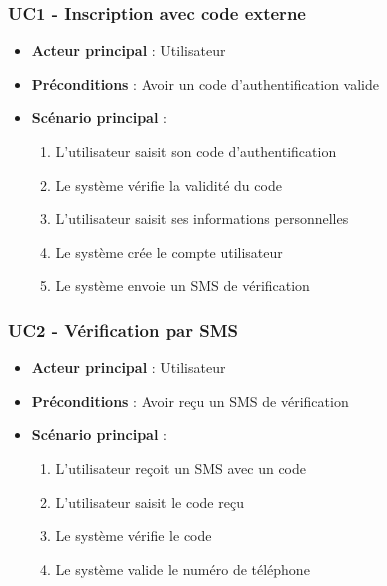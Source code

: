 \documentclass[12pt,a4paper]{article}
\begin{document}
\subsubsection{UC1 - Inscription avec code externe}
\begin{itemize}
    \item \textbf{Acteur principal} : Utilisateur
    \item \textbf{Préconditions} : Avoir un code d'authentification valide
    \item \textbf{Scénario principal} :
    \begin{enumerate}
        \item L'utilisateur saisit son code d'authentification
        \item Le système vérifie la validité du code
        \item L'utilisateur saisit ses informations personnelles
        \item Le système crée le compte utilisateur
        \item Le système envoie un SMS de vérification
    \end{enumerate}
\end{itemize}

\subsubsection{UC2 - Vérification par SMS}
\begin{itemize}
    \item \textbf{Acteur principal} : Utilisateur
    \item \textbf{Préconditions} : Avoir reçu un SMS de vérification
    \item \textbf{Scénario principal} :
    \begin{enumerate}
        \item L'utilisateur reçoit un SMS avec un code
        \item L'utilisateur saisit le code reçu
        \item Le système vérifie le code
        \item Le système valide le numéro de téléphone
    \end{enumerate}
\end{itemize}
\end{document}
